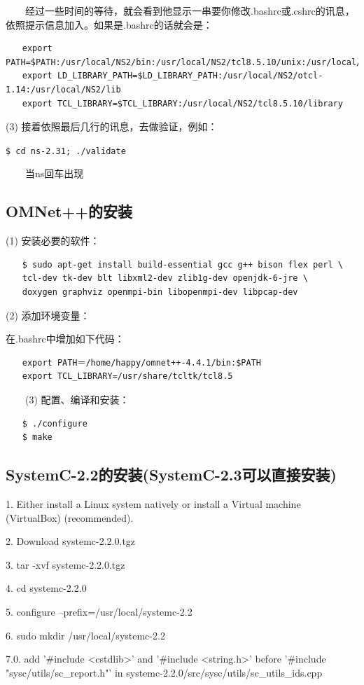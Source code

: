 　　经过一些时间的等待，就会看到他显示一串要你修改.bashrc或.cshrc的讯息，依照提示信息加入。如果是.bashrc的话就会是：
\begin{verbatim}
　　export PATH=$PATH:/usr/local/NS2/bin:/usr/local/NS2/tcl8.5.10/unix:/usr/local/NS2/tk8.5.10/unix
　　export LD_LIBRARY_PATH=$LD_LIBRARY_PATH:/usr/local/NS2/otcl-1.14:/usr/local/NS2/lib
　　export TCL_LIBRARY=$TCL_LIBRARY:/usr/local/NS2/tcl8.5.10/library
\end{verbatim}

(3) 接着依照最后几行的讯息，去做验证，例如：

\verb"$ cd ns-2.31; ./validate"

　　当ns回车出现%

\subsection{OMNet++的安装}
(1) 安装必要的软件：
\begin{verbatim}
　　$ sudo apt-get install build-essential gcc g++ bison flex perl \      
　　tcl-dev tk-dev blt libxml2-dev zlib1g-dev openjdk-6-jre \      
　　doxygen graphviz openmpi-bin libopenmpi-dev libpcap-dev
\end{verbatim}

(2) 添加环境变量：

在.bashrc中增加如下代码：
\begin{verbatim}
　　export PATH＝/home/happy/omnet++-4.4.1/bin:$PATH
　　export TCL_LIBRARY=/usr/share/tcltk/tcl8.5
\end{verbatim}

　　(3) 配置、编译和安装：
\begin{verbatim}
　　$ ./configure
　　$ make
\end{verbatim}

\subsection{SystemC-2.2的安装(SystemC-2.3可以直接安装)}
1. Either install a Linux system natively or install a Virtual machine (VirtualBox) (recommended).

2. Download systemc-2.2.0.tgz 

3. tar -xvf systemc-2.2.0.tgz

4. cd systemc-2.2.0

5. configure --prefix=/usr/local/systemc-2.2

6. sudo mkdir /usr/local/systemc-2.2

7.0. add '\#include <cstdlib>' and '\#include <string.h>' before '\#include "sysc/utils/sc\_report.h"' in systemc-2.2.0/src/sysc/utils/sc\_utils\_ids.cpp

